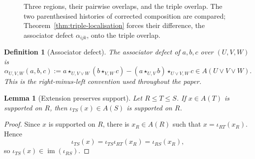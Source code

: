 \documentclass[11pt]{article}
\newtheorem{lemma}[theorem]{Lemma}
\newtheorem{definition}[theorem]{Definition}
\newcommand{\im}{\operatorname{im}}
\begin{document}
\begin{figure}[t]
\centering
{}
\caption{Three regions, their pairwise overlaps, and the triple overlap. The two parenthesised histories of corrected composition are compared; Theorem~\ref{thm:triple-localisation} forces their difference, the associator defect \(\alpha_{ijk}\), onto the triple overlap.}
\label{fig:triple}
\end{figure}

\begin{definition}[Associator defect]
The associator defect of \(a,b,c\) over \((U,V,W)\) is
\[
\alpha_{U,V,W}(a,b,c)
:=
 a\star_{U,V\vee W}(b\star_{V,W}c)
-
 (a\star_{U,V}b)\star_{U\vee V,W}c
\in A(U\vee V\vee W).
\]
This is the right-minus-left convention used throughout the paper.
\end{definition}

\begin{lemma}[Extension preserves support]
\label{lem:extension-support}
Let \(R\leq T\leq S\). If \(x\in A(T)\) is supported on \(R\), then \(\iota_{TS}(x)\in A(S)\) is supported on \(R\).
\end{lemma}

\begin{proof}
Since \(x\) is supported on \(R\), there is \(x_R\in A(R)\) such that \(x=\iota_{RT}(x_R)\). Hence
\[
\iota_{TS}(x)=\iota_{TS}\iota_{RT}(x_R)=\iota_{RS}(x_R),
\]
so \(\iota_{TS}(x)\in \im(\iota_{RS})\).
\end{proof}
\end{document}

